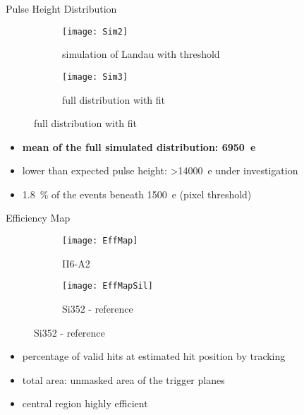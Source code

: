 \begin{frame}{Pulse Height Distribution}

	\vspace*{-10pt}
	\begin{figure} 
		\begin{center}
			\begin{subfigure}{0.48\textwidth}  
				\centering 
				\texttt{[image: Sim2]}
				\caption{simulation of Landau with threshold} 	
			\end{subfigure}
			\begin{subfigure}{0.48\textwidth} 
				\centering 
				\texttt{[image: Sim3]}
				\caption{full distribution with fit} 	
			\end{subfigure} 
		\end{center}
	\end{figure}
	
	\begin{itemize}
		\itemfill
		\item {} \textbf{mean of the full simulated distribution: \SI{6950}{e}}
		\item lower than expected pulse height: \SI{>14000}{e} \ra under investigation
		\item \SI{1.8}{\%} of the events beneath \SI{1500}{e} (pixel threshold)
	\end{itemize}

\end{frame}
\begin{frame}{Efficiency Map}

	\vspace*{-10pt}
	\begin{figure} 
		\begin{center}
			\begin{subfigure}{0.48\textwidth}  
				\centering 
				\texttt{[image: EffMap]}
				\caption{II6-A2} 	
			\end{subfigure}
			\begin{subfigure}{0.48\textwidth} 
				\centering 
				\texttt{[image: EffMapSil]}
				\caption{Si352 - reference} 	
			\end{subfigure} 
		\end{center}
	\end{figure}
	
	\begin{itemize}
		\itemfill
		\item percentage of valid hits at estimated hit position by tracking
		\item total area: unmasked area of the trigger planes
		\item central region highly efficient
	\end{itemize}

\end{frame}
